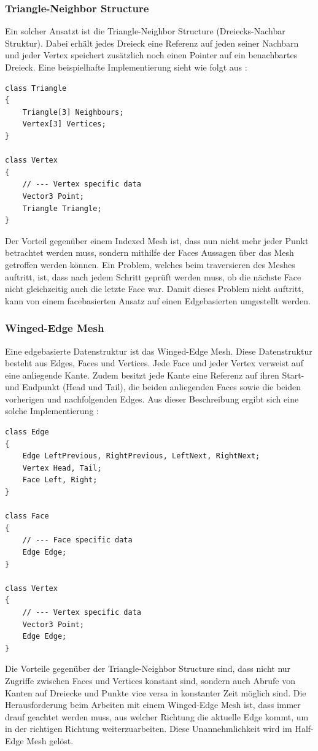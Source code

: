 \subsubsection{Triangle-Neighbor Structure}
Ein solcher Ansatzt ist die Triangle-Neighbor Structure (Dreiecks-Nachbar Struktur). Dabei erh\"alt jedes Dreieck eine Referenz auf jeden seiner Nachbarn und jeder Vertex speichert zus\"atzlich noch einen Pointer auf ein benachbartes Dreieck. Eine beispielhafte Implementierung sieht wie folgt aus \cite[S.269]{Shirley2010}:
\begin{lstlisting}
class Triangle 
{
	Triangle[3] Neighbours;
	Vertex[3] Vertices; 
}

class Vertex 
{
	// --- Vertex specific data
	Vector3 Point;
	Triangle Triangle;
}
\end{lstlisting}

Der Vorteil gegen\"uber einem Indexed Mesh ist, dass nun nicht mehr jeder Punkt betrachtet werden muss, sondern mithilfe der Faces Aussagen \"uber das Mesh getroffen werden k\"onnen. Ein Problem, welches beim traversieren des Meshes auftritt, ist, dass nach jedem Schritt gepr\"uft werden muss, ob die n\"achste Face nicht gleichzeitig auch die letzte Face war. Damit dieses Problem nicht auftritt, kann von einem facebasierten Ansatz auf einen Edgebasierten umgestellt werden.

\subsubsection{Winged-Edge Mesh}
Eine edgebasierte Datenstruktur ist das Winged-Edge Mesh. Diese Datenstruktur besteht aus Edges, Faces und Vertices. Jede Face und jeder Vertex verweist auf eine anliegende Kante. Zudem besitzt jede Kante eine Referenz auf ihren Start- und Endpunkt (Head und Tail), die beiden anliegenden Faces sowie die beiden vorherigen und nachfolgenden Edges. Aus dieser Beschreibung ergibt sich eine solche Implementierung \cite[S.273]{Shirley2010}:

\begin{lstlisting}
class Edge
{
	Edge LeftPrevious, RightPrevious, LeftNext, RightNext;
	Vertex Head, Tail;
	Face Left, Right;
}

class Face 
{
	// --- Face specific data
	Edge Edge;
}

class Vertex 
{
	// --- Vertex specific data
	Vector3 Point;
	Edge Edge;
}
\end{lstlisting}

Die Vorteile gegen\"uber der Triangle-Neighbor Structure sind, dass nicht nur Zugriffe zwischen Faces und Vertices konstant sind, sondern auch Abrufe von Kanten auf Dreiecke und Punkte vice versa in konstanter Zeit m\"oglich sind. Die Herausforderung beim Arbeiten mit einem Winged-Edge Mesh ist, dass immer drauf geachtet werden muss, aus welcher Richtung die aktuelle Edge kommt, um in der richtigen Richtung weiterzuarbeiten. Diese Unannehmlichkeit wird im Half-Edge Mesh gel\"ost.